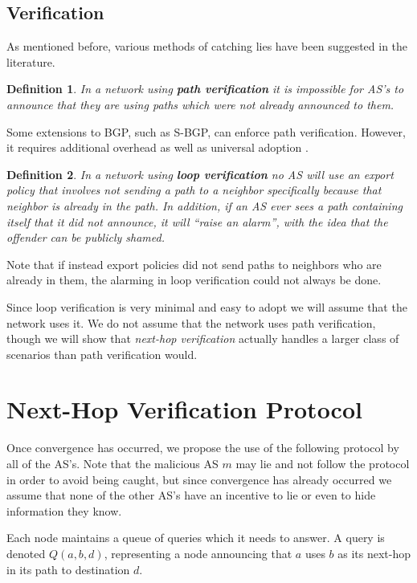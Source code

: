 \documentclass[12pt]{article}
\newtheorem{definition}{Definition}
\begin{document}
\subsection{Verification}
As mentioned before, various methods of catching lies have been suggested in the literature.

\begin{definition}
In a network using \textbf{path verification} it is impossible for AS's to announce that they are using paths which were not already announced to them.
\end{definition}

Some extensions to BGP, such as S-BGP, can enforce path verification. However, it requires additional overhead as well as universal adoption \cite{PartialDeploy}.

\begin{definition}
In a network using \textbf{loop verification} no AS will use an export policy that involves not sending a path to a neighbor specifically because that neighbor is already in the path. In addition, if an AS ever sees a path containing itself that it did not announce, it will ``raise an alarm'', with the idea that the offender can be publicly shamed.
\end{definition}

Note that if instead export policies did not send paths to neighbors who are already in them, the alarming in loop verification could not always be done.

Since loop verification is very minimal and easy to adopt we will assume that the network uses it.
We do not assume that the network uses path verification, though we will show that \emph{next-hop verification} actually handles a larger class of scenarios than path verification would.


\section{Next-Hop Verification Protocol}
Once convergence has occurred, we propose the use of the following protocol by all of the AS's. Note that the malicious AS $m$ may lie and not follow the protocol in order to avoid being caught, but since convergence has already occurred we assume that none of the other AS's have an incentive to lie or even to hide information they know.

  Each node maintains a queue of queries which it needs to answer.
  A query is denoted $Q(a,b,d)$, representing a node announcing that
  $a$ uses $b$ as its next-hop in its path to destination $d$.
\end{document}
